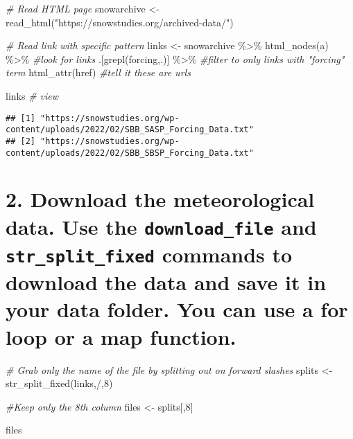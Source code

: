 \documentclass[
]{book}
\newenvironment{Shaded}{\begin{snugshade}}{\end{snugshade}}
\newcommand{\CommentTok}[1]{\textcolor[rgb]{0.56,0.35,0.01}{\textit{#1}}}
\newcommand{\DecValTok}[1]{\textcolor[rgb]{0.00,0.00,0.81}{#1}}
\newcommand{\FunctionTok}[1]{\textcolor[rgb]{0.00,0.00,0.00}{#1}}
\newcommand{\NormalTok}[1]{#1}
\newcommand{\OtherTok}[1]{\textcolor[rgb]{0.56,0.35,0.01}{#1}}
\newcommand{\SpecialCharTok}[1]{\textcolor[rgb]{0.00,0.00,0.00}{#1}}
\newcommand{\StringTok}[1]{\textcolor[rgb]{0.31,0.60,0.02}{#1}}
\begin{document}
\begin{Shaded}
\begin{Highlighting}[]
\CommentTok{\# Read HTML page }
\NormalTok{snowarchive }\OtherTok{\textless{}{-}} \FunctionTok{read\_html}\NormalTok{(}\StringTok{"https://snowstudies.org/archived{-}data/"}\NormalTok{)}

\CommentTok{\# Read link with specific pattern}
\NormalTok{links }\OtherTok{\textless{}{-}}\NormalTok{ snowarchive }\SpecialCharTok{\%\textgreater{}\%}
  \FunctionTok{html\_nodes}\NormalTok{(}\StringTok{\textquotesingle{}a\textquotesingle{}}\NormalTok{) }\SpecialCharTok{\%\textgreater{}\%} \CommentTok{\#look for links}
\NormalTok{  .[}\FunctionTok{grepl}\NormalTok{(}\StringTok{\textquotesingle{}forcing\textquotesingle{}}\NormalTok{,.)] }\SpecialCharTok{\%\textgreater{}\%} \CommentTok{\#filter to only links with "forcing" term}
  \FunctionTok{html\_attr}\NormalTok{(}\StringTok{\textquotesingle{}href\textquotesingle{}}\NormalTok{) }\CommentTok{\#tell it these are urls}

\NormalTok{links }\CommentTok{\# view}
\end{Highlighting}
\end{Shaded}

\begin{verbatim}
## [1] "https://snowstudies.org/wp-content/uploads/2022/02/SBB_SASP_Forcing_Data.txt"
## [2] "https://snowstudies.org/wp-content/uploads/2022/02/SBB_SBSP_Forcing_Data.txt"
\end{verbatim}

\hypertarget{download-the-meteorological-data.-use-the-download_file-and-str_split_fixed-commands-to-download-the-data-and-save-it-in-your-data-folder.-you-can-use-a-for-loop-or-a-map-function.}{%
\section{\texorpdfstring{2. Download the meteorological data. Use the \texttt{download\_file} and \texttt{str\_split\_fixed} commands to download the data and save it in your data folder. You can use a for loop or a map function.}{2. Download the meteorological data. Use the download\_file and str\_split\_fixed commands to download the data and save it in your data folder. You can use a for loop or a map function.}}\label{download-the-meteorological-data.-use-the-download_file-and-str_split_fixed-commands-to-download-the-data-and-save-it-in-your-data-folder.-you-can-use-a-for-loop-or-a-map-function.}}

\begin{Shaded}
\begin{Highlighting}[]
\CommentTok{\# Grab only the name of the file by splitting out on forward slashes}
\NormalTok{splits }\OtherTok{\textless{}{-}} \FunctionTok{str\_split\_fixed}\NormalTok{(links,}\StringTok{\textquotesingle{}/\textquotesingle{}}\NormalTok{,}\DecValTok{8}\NormalTok{)}

\CommentTok{\#Keep only the 8th column}
\NormalTok{files }\OtherTok{\textless{}{-}}\NormalTok{ splits[,}\DecValTok{8}\NormalTok{] }

\NormalTok{files}
\end{Highlighting}
\end{Shaded}
\end{document}

